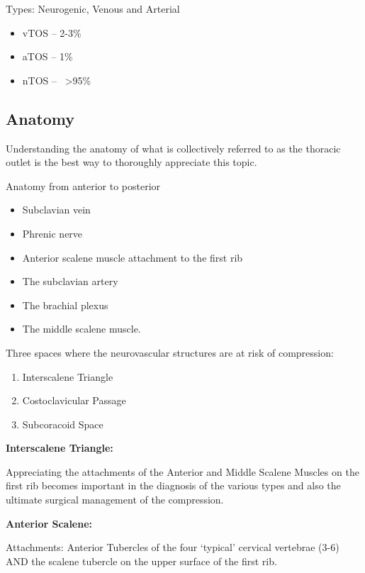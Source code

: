 \documentclass[
]{book}
\begin{document}
Types: Neurogenic, Venous and Arterial~

\begin{itemize}
\item
  vTOS -- 2-3\%
\item
  aTOS -- 1\%
\item
  nTOS --~ \textgreater95\% \citep{humphries124ThoracicOutlet2019}
\end{itemize}

\hypertarget{anatomy}{%
\subsection{Anatomy}\label{anatomy}}

Understanding the anatomy of what is collectively referred to as the
thoracic outlet is the best way to thoroughly appreciate this topic.

Anatomy from anterior to posterior

\begin{itemize}
\item
  Subclavian vein
\item
  Phrenic nerve
\item
  Anterior scalene muscle attachment to the first rib
\item
  The subclavian artery
\item
  The brachial plexus
\item
  The middle scalene muscle.
\end{itemize}

Three spaces where the neurovascular structures are at risk of
compression:

\begin{enumerate}
\def\labelenumi{\arabic{enumi}.}
\item
  Interscalene Triangle~
\item
  Costoclavicular Passage~\citep{garygwindAnatomicExposuresVascular2013}
\item
  Subcoracoid Space \citep{garygwindAnatomicExposuresVascular2013}
\end{enumerate}

\textbf{Interscalene Triangle:}

Appreciating the attachments of the Anterior and Middle Scalene Muscles
on the first rib becomes important in the diagnosis of the various types
and also the ultimate surgical management of the compression.

\textbf{Anterior Scalene:}

Attachments: Anterior Tubercles of the four `typical' cervical vertebrae
(3-6) AND the scalene tubercle on the upper surface of the first rib.
\end{document}
